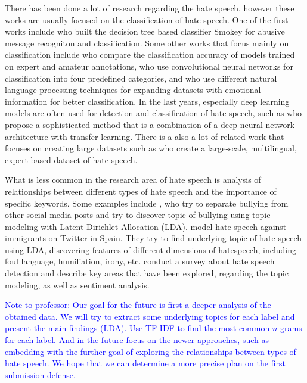 \documentclass[fleqn,moreauthors,10pt]{ds_report}
\begin{document}
There has been done a lot of research regarding the hate speech, however these works are usually focused on the classification of hate speech. One of the first works include \cite{spertus1997smokey} who built the decision tree based classifier Smokey for abusive message recogniton and classification. Some other works that focus mainly on classification include \cite{waseem2016you} who compare the classification accuracy of models trained on expert and amateur annotations, \cite{gamback2017using} who use convolutional neural networks for classification into four predefined categories, and \cite{martins2018hate} who use different natural language processing techniques for expanding datasets with emotional information for better classification. In the last years, especially deep learning models are often used for detection and classification of hate speech, such as \cite{rizoiu2019transfer} who propose a sophisticated method that is a combination of a deep neural network architecture with transfer learning.
There is a also a lot of related work that focuses on creating large datasets such as \cite{chung2019conan} who create a large-scale, multilingual, expert based dataset of hate speech. 

What is less common in the research area of hate speech is analysis of relationships between different types of hate speech and the importance of specific keywords. Some examples include \cite{xu2012learning}, who try to separate bullying from other social media posts and try to discover topic of bullying using topic modeling with Latent Dirichlet Allocation (LDA). \cite{calderon2020topic} model hate speech against immigrants on Twitter in Spain. They try to find underlying topic of hate speech using LDA, discovering features of different dimensions of hatespeech, including foul language, humiliation, irony, etc. \cite{schmidt2017survey} conduct a survey about hate speech detection and describe key areas that have been explored, regarding the topic modeling, as well as sentiment analysis.

\textcolor{blue}{Note to professor: Our goal for the future is first a deeper analysis of the obtained data. We will try to extract some underlying topics for each label and present the main findings (LDA). Use TF-IDF to find the most common $n$-grams for each label. And in the future focus on the newer approaches, such as embedding with the further goal of exploring the relationships between types of hate speech. We hope that we can determine a more precise plan on the first submission defense.}
\end{document}
